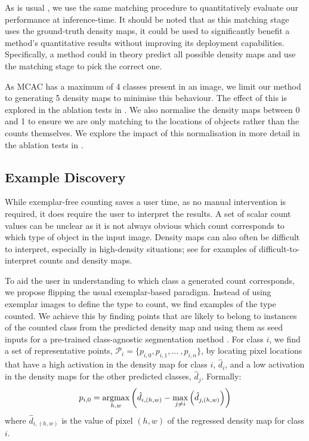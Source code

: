 \documentclass[../thesis.tex]{subfiles}
\begin{document}
As is usual \cite{troisemaine2023novel, Yang2010, DMShobley,Xie2016}, we use the same matching procedure to quantitatively evaluate our performance at inference-time. 
It should be noted that as this matching stage uses the ground-truth density maps, it could be used to significantly benefit a method's quantitative results without improving its deployment capabilities.
Specifically, a method could in theory predict all possible density maps and use the matching stage to pick the correct one.

As MCAC has a maximum of 4 classes present in an image, we limit our method to generating 5 density maps to minimise this behaviour.
The effect of this is explored in the ablation tests in .
We also normalise the density maps between 0 and 1 to ensure we are only matching to the locations of objects rather than the counts themselves.
We explore the impact of this normalisation in more detail in the ablation tests in .

\subsection{Example Discovery}
While exemplar-free counting saves a user time, as no manual intervention is required, it does require the user to interpret the results. 
A set of scalar count values can be unclear as it is not always obvious which count corresponds to which type of object in the input image. 
Density maps can also often be difficult to interpret, especially in high-density situations; see  for examples of difficult-to-interpret counts and density maps.

To aid the user in understanding to which class a generated count corresponds, we propose flipping the usual exemplar-based paradigm.
Instead of using exemplar images to define the type to count, we find examples of the type counted. 
We achieve this by finding points that are likely to belong to instances of the counted class from the predicted density map and using them as seed inputs for a pre-trained class-agnostic segmentation method \cite{kirillov2023segany}. 
For class $i$, we find a set of representative points, $\mathcal{P}_i = \{p_{i,0}, p_{i, 1},...\ , p_{i, n}\}$, by locating pixel locations that have a high activation in the density map for class $i$, $\hat{d}_i$, and a low activation in the density maps for the other predicted classes, $\hat{d}_j$.
Formally:
\begin{equation}
    p_{i,0} = \operatorname*{argmax}_{h,w}\left(\hat{d}_{i, (h,w)} - \max_{j\neq i}\left(\hat{d}_{j, (h,w)}\right)\right)
\end{equation}
\noindent where $\hat{d}_{i, (h,w)}$ is the value of pixel $(h, w)$ of the regressed density map for class $i$.
\end{document}
